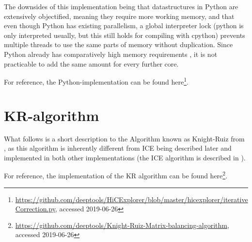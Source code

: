 The downsides of this implementation being that datastructures in Python are
extensively objectified, meaning they require more working memory, and that
even though Python has existing parallelism, a global interpreter lock (python
is only interpreted usually, but this still holds for compiling with cpython)
prevents multiple threads to use the same parts of memory without duplication.
Since Python already has comparatively high memory requirements , it is not practicable to add the same amount for every
further core.

For reference, the Python-implementation can be found
here\footnote{\url{https://github.com/deeptools/HiCExplorer/blob/master/hicexplorer/iterativeCorrection.py},
accessed 2019-06-26}.




\section{KR-algorithm}\label{sec:KR}


What follows is a short description to the Algorithm known as Knight-Ruiz from
\cite{knight2013fast}, as this algorithm is inherently different from ICE being
described later and implemented in both other implementations
(the ICE algorithm is described in ).






For reference, the implementation of the KR algorithm can be found here\footnote{\url{https://github.com/deeptools/Knight-Ruiz-Matrix-balancing-algorithm}, accessed 2019-06-26}.










